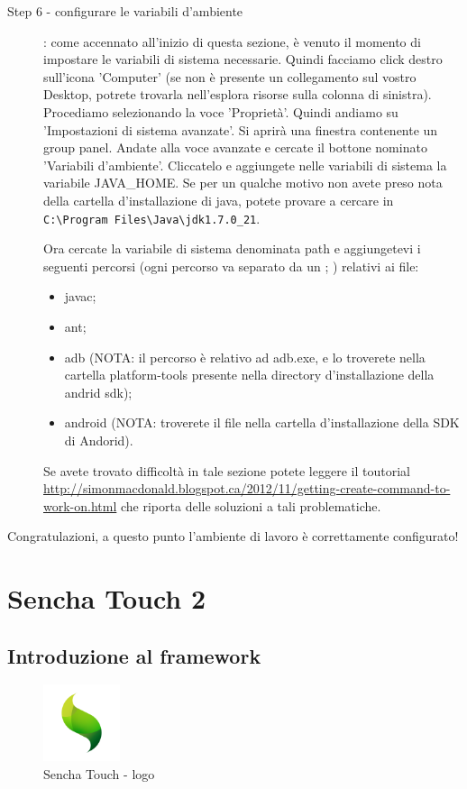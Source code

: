 \documentclass[10pt,a4paper,onecolumn]{article}
\begin{document}
\begin{description}
	\item[Step 6 - configurare le variabili d'ambiente] : come accennato all'inizio di questa sezione, è venuto il momento di impostare le variabili di sistema necessarie. Quindi facciamo click destro sull'icona 'Computer' (se non è presente un collegamento sul vostro Desktop, potrete trovarla nell'esplora risorse sulla colonna di sinistra). Procediamo selezionando la voce 'Proprietà'. Quindi andiamo su 'Impostazioni di sistema avanzate'. Si aprirà una finestra contenente un group panel. Andate alla voce avanzate e cercate il bottone nominato 'Variabili d'ambiente'. Cliccatelo e aggiungete nelle variabili di sistema la variabile JAVA\_HOME. Se per un qualche motivo non avete preso nota della cartella d'installazione di java, potete provare a cercare in \verb|C:\Program Files\Java\jdk1.7.0_21|.
	
	Ora cercate la variabile di sistema denominata path e aggiungetevi i seguenti percorsi (ogni percorso va separato da un ; ) relativi ai file:
	\begin{itemize}
		\item javac;
		\item ant;
		\item adb (NOTA: il percorso è relativo ad adb.exe, e lo troverete nella cartella platform-tools presente nella directory d'installazione della andrid sdk);
		\item android (NOTA: troverete il file nella cartella d'installazione della SDK di Andorid).
	\end{itemize}
	
	Se avete trovato difficoltà in tale sezione potete leggere il toutorial \url{http://simonmacdonald.blogspot.ca/2012/11/getting-create-command-to-work-on.html} che riporta delle soluzioni a tali problematiche.

\end{description}

Congratulazioni, a questo punto l'ambiente di lavoro è correttamente configurato!

\clearpage

\section{Sencha Touch 2}
\subsection{Introduzione al framework}

\begin{figure}[h]
	\centering
	\includegraphics[width=0.2\textwidth]{img/sencha}
	\caption{Sencha Touch - logo}						
	\label{fig:sencha logo}
\end{figure}
\end{document}
